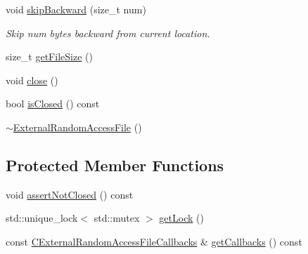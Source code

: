 \begin{DoxyCompactItemize}
void \hyperlink{classBUSBOY_1_1ExternalRandomAccessFile_a276a851c64fd6de2ecc00d06ed1f2fed}{skipBackward} (size\_\-t num)
\begin{DoxyCompactList}\small\item\em Skip num bytes backward from current location. \item\end{DoxyCompactList}\item 
size\_\-t \hyperlink{classBUSBOY_1_1ExternalRandomAccessFile_ac989792676e37f9d363804162e21aef9}{getFileSize} ()
\item 
void \hyperlink{classBUSBOY_1_1ExternalRandomAccessFile_a9a59b70aa2a9cb50c484bf6a9e7ef8cd}{close} ()
\item 
bool \hyperlink{classBUSBOY_1_1ExternalRandomAccessFile_aabfe65bbe76080f7e551ca2c8ea4123d}{isClosed} () const 
\item 
\hyperlink{classBUSBOY_1_1ExternalRandomAccessFile_ab425cf187074bb879ffb61c8dd4cf846}{$\sim$ExternalRandomAccessFile} ()
\end{DoxyCompactItemize}
\subsection*{Protected Member Functions}
\begin{DoxyCompactItemize}
\item 
void \hyperlink{classBUSBOY_1_1ExternalRandomAccessFile_a6212db53d942a177e41fcd54eccaa687}{assertNotClosed} () const 
\item 
std::unique\_\-lock$<$ std::mutex $>$ \hyperlink{classBUSBOY_1_1ExternalRandomAccessFile_af14518d87afea586cd26e050e7046063}{getLock} ()
\item 
const \hyperlink{structCExternalRandomAccessFileCallbacksStruct}{CExternalRandomAccessFileCallbacks} \& \hyperlink{classBUSBOY_1_1ExternalRandomAccessFile_a09ab5302feff98028a288e519e386e2f}{getCallbacks} () const 
\end{DoxyCompactItemize}


